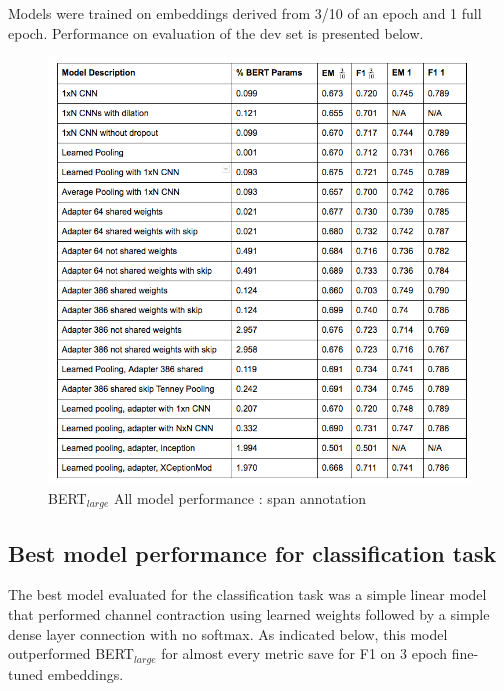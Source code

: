 Models were trained on embeddings derived from 3/10 of an epoch and 1 full epoch.  Performance on evaluation of the dev set is presented below.

\begin{figure}[h]
	\centering
	\includegraphics[width=\linewidth]{images/span/Span_Annotation_All_Model_Results.png}%
	\caption{BERT$_{large}$ All model performance : span annotation}
\end{figure}

\subsection{Best model performance for classification task}

The best model evaluated for the classification task was a simple linear model that performed channel contraction using learned weights followed by a simple dense layer connection with no softmax.  As indicated below, this model outperformed BERT$_{large}$ for almost every metric save for F1 on 3 epoch fine-tuned embeddings.

